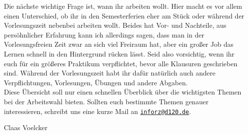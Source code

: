 {	Die nächste wichtige Frage ist, wann ihr arbeiten wollt. Hier macht es vor allem einen Unterschied, ob ihr in den Semesterferien eher am Stück oder während der Vorlesungszeit nebenbei arbeiten wollt. Beides hat Vor- und Nachteile, aus persöhnlicher Erfahrung kann ich allerdings sagen, dass man in der Vorlesungsfreien Zeit zwar an sich viel Freiraum hat, aber ein großer Job das Lernen schnell in den Hintergrund rücken lässt. Seid also vorsichtig, wenn ihr euch für ein größeres Praktikum verpflichtet, bevor alle Klausuren geschrieben sind. Während der Vorlesungszeit habt ihr dafür natürlich auch andere Verpflichtungen, Vorlesungen, Übungen und andere Abgaben. \\
	
	Diese Übersicht soll nur einen schnellen Überblick über die wichtigsten
    Themen bei der Arbeitswahl bieten. Sollten euch bestimmte Themen genauer
    interessieren, schreibt uns eine kurze Mail an
    \texttt{\href{mailto:inforz@d120.de}{inforz@d120.de}}.
	
}
{Claas Voelcker}
\vfill
{}
